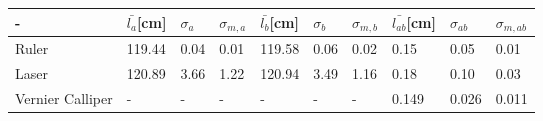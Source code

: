 \begin{tabular}{| l | l | l | l | l | l | l | l | l | l |}
\hline
    -  & $\bar{l_{a}}$[cm] & $\sigma_a$ & $\sigma_{m, a}$& $\bar{l_{b}}$[cm] & $\sigma_b$ & $\sigma_{m, b}$ & $\bar{l_{ab}}$[cm] & $\sigma_{ab}$ & $\sigma_{m, ab}$ \\ \hline

    Ruler  & 119.44 & 0.04 & 0.01 & 119.58 & 0.06 & 0.02 & 0.15 & 0.05 & 0.01 \\ \hline

    Laser  & 120.89 & 3.66 & 1.22 & 120.94 & 3.49 & 1.16 & 0.18 & 0.10 & 0.03 \\ \hline

    Vernier Calliper  & - & - & - & - & -& - & 0.149 & 0.026 & 0.011 \\ \hline
\end{tabular}